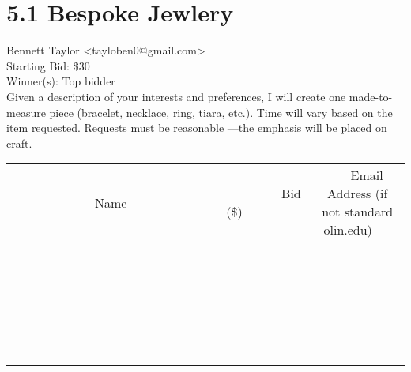 \documentclass[11pt]{article}
\begin{document}
					\section*{5.1 Bespoke Jewlery}
					Bennett Taylor <tayloben0@gmail.com> \\
					Starting Bid: \$30 \\
					Winner(s): Top bidder \\
					Given a description of your interests and preferences, I will create one made-to-measure piece (bracelet, necklace, ring, tiara, etc.). Time will vary based on the item requested. Requests must be reasonable —the emphasis will be placed on craft. \\
					[6ex]
					\begin{tabular}{c c c}
						~~~~~~~~~~~~~Name~~~~~~~~~~~~~ & ~~~~~~~~~Bid (\$)~~~~~~~~~ & ~~~Email Address (if not standard olin.edu)~~~ \\
				
 & & \\
\hline
 & & \\
\hline
 & & \\
\hline
 & & \\
\hline
 & & \\
\hline
 & & \\
\hline
 & & \\
\hline
 & & \\
\hline
 & & \\
\hline
 & & \\
\hline
 & & \\
\hline
 & & \\
\hline
 & & \\
\hline
 & & \\
\hline
 & & \\
\hline
 & & \\
\hline
 & & \\
\hline
 & & \\
\hline
 & & \\
\hline
 & & \\
\hline
 & & \\
\hline
 & & \\
\hline
 & & \\
\hline
 & & \\
\hline
 & & \\
\hline
 & & \\
\hline
					\end{tabular}
					\clearpage
				
\end{document}
